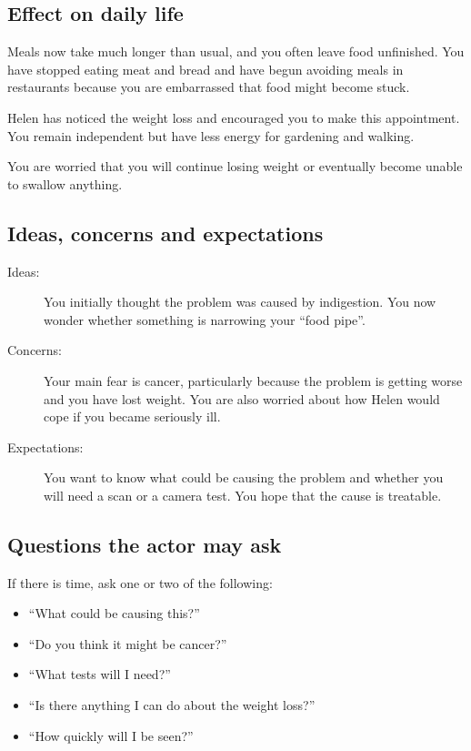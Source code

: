 \subsection*{Effect on daily life}

Meals now take much longer than usual, and you often leave food
unfinished. You have stopped eating meat and bread and have begun
avoiding meals in restaurants because you are embarrassed that food
might become stuck.

Helen has noticed the weight loss and encouraged you to make this
appointment. You remain independent but have less energy for gardening
and walking.

You are worried that you will continue losing weight or eventually
become unable to swallow anything.

\subsection*{Ideas, concerns and expectations}


\begin{description}
    \item[Ideas:]
    You initially thought the problem was caused by indigestion. You now
    wonder whether something is narrowing your \enquote{food pipe}.

    \item[Concerns:]
    Your main fear is cancer, particularly because the problem is
    getting worse and you have lost weight. You are also worried about
    how Helen would cope if you became seriously ill.

    \item[Expectations:]
    You want to know what could be causing the problem and whether you
    will need a scan or a camera test. You hope that the cause is
    treatable.
\end{description}


\subsection*{Questions the actor may ask}

If there is time, ask one or two of the following:

\begin{itemize}
    \item \enquote{What could be causing this?}
    \item \enquote{Do you think it might be cancer?}
    \item \enquote{What tests will I need?}
    \item \enquote{Is there anything I can do about the weight loss?}
    \item \enquote{How quickly will I be seen?}
\end{itemize}

